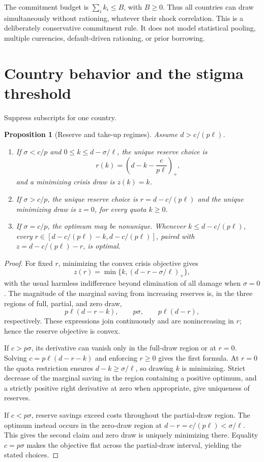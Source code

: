 \documentclass[11pt,a4paper]{article}
\newtheorem{proposition}[theorem]{Proposition}
\theoremstyle{definition}
\theoremstyle{remark}
\begin{document}
The commitment budget is $\sum_i k_i\le B$, with $B\ge0$. Thus all countries can draw simultaneously without rationing, whatever their shock correlation. This is a deliberately conservative commitment rule. It does not model statistical pooling, multiple currencies, default-driven rationing, or prior borrowing.
\section{Country behavior and the stigma threshold}
Suppress subscripts for one country.
\begin{proposition}[Reserve and take-up regimes]
Assume $d>c/(p\ell)$.
\begin{enumerate}
\item If $\sigma<c/p$ and $0\le k\le d-\sigma/\ell$, the unique reserve choice is
\[
 r(k)=\left(d-k-\frac c{p\ell}\right)_+,
\]
and a minimizing crisis draw is $z(k)=k$.
\item If $\sigma>c/p$, the unique reserve choice is
$r=d-c/(p\ell)$ and the unique minimizing draw is $z=0$, for every quota $k\ge0$.
\item If $\sigma=c/p$, the optimum may be nonunique. Whenever $k\le d-c/(p\ell)$, every $r\in[d-c/(p\ell)-k,d-c/(p\ell)]$, paired with $z=d-c/(p\ell)-r$, is optimal.
\end{enumerate}
\end{proposition}
\begin{proof}
For fixed $r$, minimizing the convex crisis objective gives
\[
 z(r)=\min\{k,(d-r-\sigma/\ell)_+\},
\]
with the usual harmless indifference beyond elimination of all damage when $\sigma=0$. The magnitude of the marginal saving from increasing reserves is, in the three regions of full, partial, and zero draw,
\[
 p\ell(d-r-k),\qquad p\sigma,\qquad p\ell(d-r),
\]
respectively. These expressions join continuously and are nonincreasing in $r$; hence the reserve objective is convex.

If $c>p\sigma$, its derivative can vanish only in the full-draw region or at $r=0$. Solving $c=p\ell(d-r-k)$ and enforcing $r\ge0$ gives the first formula. At $r=0$ the quota restriction ensures $d-k\ge\sigma/\ell$, so drawing $k$ is minimizing. Strict decrease of the marginal saving in the region containing a positive optimum, and a strictly positive right derivative at zero when appropriate, give uniqueness of reserves.

If $c<p\sigma$, reserve savings exceed costs throughout the partial-draw region. The optimum instead occurs in the zero-draw region at $d-r=c/(p\ell)<\sigma/\ell$. This gives the second claim and zero draw is uniquely minimizing there. Equality $c=p\sigma$ makes the objective flat across the partial-draw interval, yielding the stated choices.
\end{proof}
\end{document}
